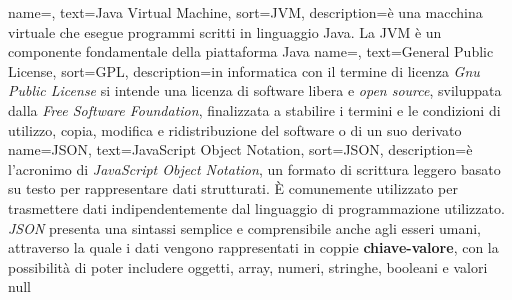  {
    name=,
    text=Java Virtual Machine,
    sort=JVM,
    description={è una macchina virtuale che esegue programmi scritti in linguaggio Java. La JVM è un componente fondamentale della piattaforma Java}
}
     {
        name=,
        text=General Public License,
        sort=GPL,
        description={in informatica con il termine di licenza \textit{Gnu Public License} si intende  
        una licenza di software libera e \textit{open source}, sviluppata dalla \textit{Free Software Foundation}, finalizzata a stabilire i termini e le condizioni 
        di utilizzo, copia, modifica e ridistribuzione del software o di un suo derivato}
    }
    {
        name={JSON},
        text=JavaScript Object Notation,
        sort=JSON,
        description={è l'acronimo di \textit{JavaScript Object Notation}, un formato di scrittura leggero basato su testo per rappresentare dati strutturati. 
        È comunemente utilizzato per trasmettere dati indipendentemente dal linguaggio di programmazione utilizzato. \textit{JSON} presenta una sintassi semplice e comprensibile anche agli 
        esseri umani, attraverso la quale i dati vengono rappresentati in coppie \textbf{chiave-valore}, con la possibilità di poter includere 
        oggetti, array, numeri, stringhe, booleani e valori null}
    }
